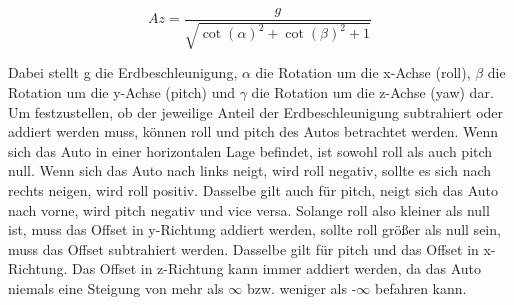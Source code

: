 \begin{equation}
Az=\frac{g}{\sqrt{\cot(\alpha)^2+\cot(\beta)^2+1}}
\label{eqn:imuFz}
\end{equation}

Dabei stellt g die Erdbeschleunigung, $\alpha$ die Rotation um die x-Achse (roll), $\beta$ die Rotation um die y-Achse (pitch) und $\gamma$ die Rotation um die z-Achse (yaw) dar. \\
Um festzustellen, ob der jeweilige Anteil der Erdbeschleunigung subtrahiert oder addiert werden muss, können roll und pitch des Autos betrachtet werden. Wenn sich das Auto in einer horizontalen Lage befindet, ist sowohl roll als auch pitch null. Wenn sich das Auto nach links neigt, wird roll negativ, sollte es sich nach rechts neigen, wird roll positiv. Dasselbe gilt auch für pitch, neigt sich das Auto nach vorne, wird pitch negativ und vice versa. Solange roll also kleiner als null ist, muss das Offset in y-Richtung addiert werden, sollte roll größer als null sein, muss das Offset subtrahiert werden. Dasselbe gilt für pitch und das Offset in x-Richtung. Das Offset in z-Richtung kann immer addiert werden, da das Auto niemals eine Steigung von mehr als $\infty$ bzw. weniger als -$\infty$ befahren kann.
